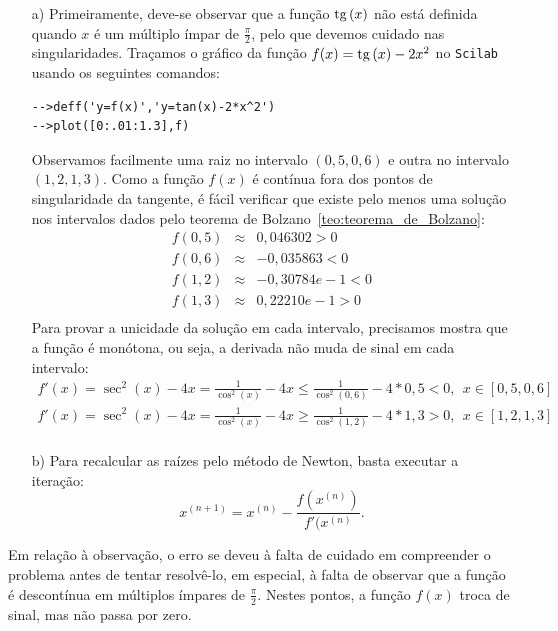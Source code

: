 \begin{resp}
  \begin{itemize}
\item[a)]Primeiramente, deve-se observar que a função $\operatorname{tg}\,(x)$ não está definida quando $x$ é um múltiplo ímpar de $\frac{\pi}{2}$, pelo que devemos cuidado nas singularidades. Traçamos o gráfico da função $f(x)=\operatorname{tg}\,(x)-2x^2$ no \verb+Scilab+ usando os seguintes comandos:
\begin{verbatim}
-->deff('y=f(x)','y=tan(x)-2*x^2')
-->plot([0:.01:1.3],f)
\end{verbatim} 
Observamos facilmente uma raiz no intervalo $(0,5, 0,6)$ e outra no intervalo $(1,2, 1,3)$. Como a função $f(x)$ é contínua fora dos pontos de singularidade da tangente, é fácil verificar que existe pelo menos uma solução nos intervalos dados pelo teorema de Bolzano~\ref{teo:teorema_de_Bolzano}:
\begin{eqnarray*}
f(0,5) &\approx& 0,046302 >0\\
f(0,6) &\approx& -0,035863 <0\\
f(1,2) &\approx& -0,30784e-1 <0\\
f(1,3) &\approx&  0,22210e-1>0\\
\end{eqnarray*} 
Para provar a unicidade da solução em cada intervalo, precisamos mostra que a função é monótona, ou seja, a derivada não muda de sinal em cada intervalo:
\begin{eqnarray*}
f'(x)=\sec^2(x)-4x=\frac{1}{\cos^2(x)}-4x\leq \frac{1}{\cos^2(0,6)}-4*0,5<0, ~~x\in[ 0,5, 0,6]\\
f'(x)=\sec^2(x)-4x=\frac{1}{\cos^2(x)}-4x\geq \frac{1}{\cos^2(1,2)}-4*1,3>0, ~~x\in[ 1,2, 1,3]\\
\end{eqnarray*} 



\item[b)] Para recalcular as raízes pelo método de Newton, basta executar a iteração:
$$x^{(n+1)}=x^{(n)}-\frac{f(x^{(n)})}{f'(x^{(n)}}.$$    
\end{itemize}
Em relação à observação, o erro se deveu à falta de cuidado em compreender o problema antes de tentar resolvê-lo, em especial, à falta de observar que a função é descontínua em  múltiplos ímpares de $\frac{\pi}{2}$. Nestes pontos, a função $f(x)$ troca de sinal, mas não passa por zero.    
\end{resp}
\fi


